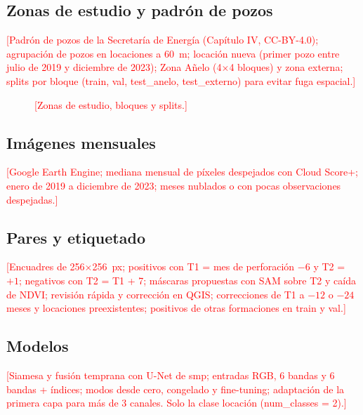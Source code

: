 \documentclass[10pt,a4paper]{article}
\newcommand{\pend}[1]{\textcolor{red}{[#1]}}
\newcommand{\figpend}[1]{\fbox{\parbox[c][3.5cm][c]{0.92\columnwidth}{\centering\small\textcolor{red}{#1}}}}
\begin{document}
\subsection{Zonas de estudio y padrón de pozos}
\pend{Padrón de pozos de la Secretaría de Energía (Capítulo IV, CC-BY-4.0); agrupación de pozos en locaciones a 60~m;
locación nueva (primer pozo entre julio de 2019 y diciembre de 2023); Zona Añelo (4$\times$4 bloques) y zona externa;
splits por bloque (train, val, test\_anelo, test\_externo) para evitar fuga espacial.}

\begin{figure}[t]
\centering
\figpend{Figura: mapa de las dos zonas con los bloques coloreados por split y las locaciones nuevas}
\caption{\pend{Zonas de estudio, bloques y splits.}}
\label{fig:zonas}
\end{figure}

\subsection{Imágenes mensuales}
\pend{Google Earth Engine; mediana mensual de píxeles despejados con Cloud Score+; enero de 2019 a diciembre de 2023;
meses nublados o con pocas observaciones despejadas.}

\subsection{Pares y etiquetado}
\pend{Encuadres de 256$\times$256~px; positivos con T1 = mes de perforación $-6$ y T2 = $+1$; negativos con T2 = T1 + 7;
máscaras propuestas con SAM sobre T2 y caída de NDVI; revisión rápida y corrección en QGIS; correcciones de T1 a $-12$ o $-24$
meses y locaciones preexistentes; positivos de otras formaciones en train y val.}

\subsection{Modelos}
\pend{Siamesa y fusión temprana con U-Net de smp; entradas RGB, 6 bandas y 6 bandas + índices; modos desde cero,
congelado y fine-tuning; adaptación de la primera capa para más de 3 canales. Solo la clase locación (num\_classes = 2).}
\end{document}
